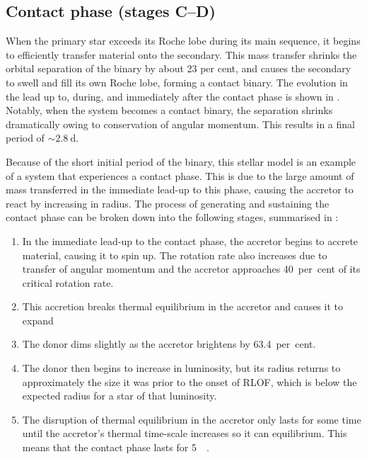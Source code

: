 \subsection[Contact phase]{Contact phase (stages C--D)}\label{sec:contact_phase_stages_c_d_}

When the primary star exceeds its Roche lobe during its main sequence, it begins to efficiently transfer material onto the secondary. This mass transfer shrinks the orbital separation of the binary by about 23 per cent, and causes the secondary to swell and fill its own Roche lobe, forming a contact binary. The evolution in the lead up to, during, and immediately after the contact phase is shown in . Notably, when the system becomes a contact binary, the separation shrinks dramatically owing to conservation of angular momentum. This results in a final period of $\sim\SI{2.8}{\day}$.

Because of the short initial period of the binary, this stellar model is an example of a system that experiences a contact phase. This is due to the large amount of mass transferred in the immediate lead-up to this phase, causing the accretor to react by increasing in radius. The process of generating and sustaining the contact phase can be broken down into the following stages, summarised in :

\begin{enumerate}
    \item In the immediate lead-up to the contact phase, the accretor begins to accrete material, causing it to spin up. The rotation rate also increases due to transfer of angular momentum and the accretor approaches 40~per~cent of its critical rotation rate.
    \item This accretion breaks thermal equilibrium in the accretor and causes it to expand \citep{Kippenhahn:1977, Neo:1977, Lau:2024}
    \item The donor dims slightly as the accretor brightens by 63.4~per~cent.
    \item The donor then begins to increase in luminosity, but its radius returns to approximately the size it was prior to the onset of RLOF, which is below the expected radius for a star of that luminosity.
    \item The disruption of thermal equilibrium in the accretor only lasts for some time until the accretor's thermal time-scale increases so it can equilibrium. This means that the contact phase lasts for \SI{5}{\kilo\year}.
\end{enumerate}

